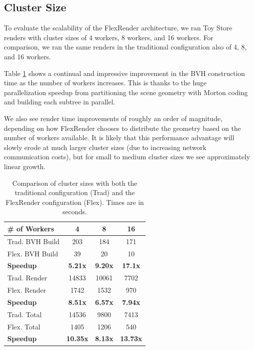 \documentclass[a4paper,twoside]{article}
\begin{document}
\subsection{Cluster Size}
\label{clustersize}

To evaluate the scalability of the FlexRender architecture, we ran Toy Store
renders with cluster sizes of 4 workers, 8 workers, and 16 workers. For
comparison, we ran the same renders in the traditional configuration also of
4, 8, and 16 workers.

Table \ref{tb:clustersize} shows a continual and impressive improvement in the
BVH construction time as the number of workers increases. This is thanks to the
huge parallelization speedup from partitioning the scene geometry with Morton
coding and building each subtree in parallel.

We also see render time improvements of roughly an order of magnitude, depending
on how FlexRender chooses to distribute the geometry based on the number of
workers available. It is likely that this performance advantage will slowly
erode at much larger cluster sizes (due to increasing network communication
costs), but for small to medium cluster sizes we see approximately linear growth.

\begin{table}
\begin{center}
\begin{tabular}{|l||c|c|c|}
    \hline
    \# of Workers & 4 & 8 & 16 \\
    \hline
    \hline
    Trad. BVH Build & 203 & 184 & 171 \\
    \hline
    Flex. BVH Build & 39 & 20 & 10 \\
    \hline
    \textbf{Speedup} & \textbf{5.21x} & \textbf{9.20x} & \textbf{17.1x} \\
    \hline
    \hline
    Trad. Render & 14833 & 10061 & 7702 \\
    \hline
    Flex. Render & 1742 & 1532  & 970 \\
    \hline
    \textbf{Speedup} & \textbf{8.51x} & \textbf{6.57x} & \textbf{7.94x} \\
    \hline
    \hline
    Trad. Total & 14536 & 9800 & 7413 \\
    \hline
    Flex. Total & 1405 & 1206 & 540 \\
    \hline
    \textbf{Speedup} & \textbf{10.35x} & \textbf{8.13x} & \textbf{13.73x} \\
    \hline
\end{tabular}
\caption{Comparison of cluster sizes with both the traditional configuration (Trad) and the FlexRender configuration (Flex). Times are in seconds.}
\label{tb:clustersize}
\end{center}
\end{table}
\end{document}
